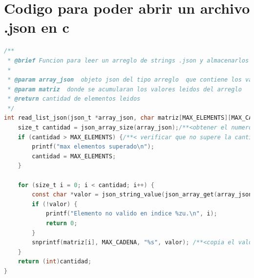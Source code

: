 \section*{Codigo para poder abrir un archivo .json en c}
\begin{lstlisting}[style=CodeStyle, language=C, caption={read\_list\_json}, label={lst:codigo}]
    /**
 * @brief Funcion para leer un arreglo de strings .json y almacenarlos en una matriz
 * 
 * @param array_json  objeto json del tipo arreglo  que contiene los valores se van a leer
 * @param matriz  donde se acumularan los valores leidos del arreglo
 * @return cantidad de elementos leidos
 */
int read_list_json(json_t *array_json, char matriz[MAX_ELEMENTS][MAX_CADENA]) {
    size_t cantidad = json_array_size(array_json);/**<obtener el numero de elementos en el arreglo json*/
    if (cantidad > MAX_ELEMENTS) {/**< verificar que no supere la cantidad permitida*/
        printf("max elementos superado\n");
        cantidad = MAX_ELEMENTS;
    }

    for (size_t i = 0; i < cantidad; i++) {
        const char *valor = json_string_value(json_array_get(array_json, i));  /**< obtener el valor del string en el indice i de la matriz*/
        if (!valor) {
            printf("Elemento no valido en indice %zu.\n", i);
            return 0;
        }
        snprintf(matriz[i], MAX_CADENA, "%s", valor); /**<copia el valor del string donde corresponda en la matriz */
    }
    return (int)cantidad; 
}
\end{lstlisting}

